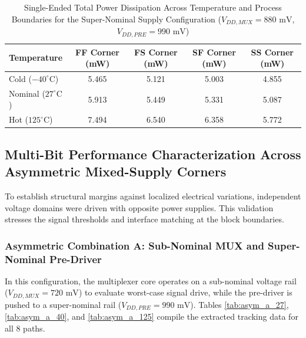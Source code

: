 \begin{table}[H]
    \centering
    \renewcommand{\arraystretch}{1.3}
    \setlength{\tabcolsep}{10pt}
    \small
    \begin{tabular}{|l|c|c|c|c|}
        \hline
        \textbf{Temperature} & \textbf{FF Corner (mW)} & \textbf{FS Corner (mW)} & \textbf{SF Corner (mW)} & \textbf{SS Corner (mW)} \\ \hline
        Cold ($-40^\circ\text{C}$) & 5.465 & 5.121 & 5.003 & 4.855 \\ \hline
        Nominal ($27^\circ\text{C}$) & 5.913 & 5.449 & 5.331 & 5.087 \\ \hline
        Hot ($125^\circ\text{C}$) & 7.494 & 6.540 & 6.358 & 5.772 \\ \hline
    \end{tabular}
    \vspace{2mm}
    \caption{Single-Ended Total Power Dissipation Across Temperature and Process Boundaries for the Super-Nominal Supply Configuration ($V_{DD,MUX} = 880\text{ mV}$, $V_{DD,PRE} = 990\text{ mV}$)}
    \label{tab:supernominal_power_summary}
\end{table}


\subsection{Multi-Bit Performance Characterization Across Asymmetric Mixed-Supply Corners}
\label{subsec:asymmetric_supply_multibit_corners}

To establish structural margins against localized electrical variations, independent voltage domains were driven with opposite power supplies. This validation stresses the signal thresholds and interface matching at the block boundaries.

\subsubsection*{Asymmetric Combination A: Sub-Nominal MUX and Super-Nominal Pre-Driver}

In this configuration, the multiplexer core operates on a sub-nominal voltage rail ($V_{DD,MUX} = 720\text{ mV}$) to evaluate worst-case signal drive, while the pre-driver is pushed to a super-nominal rail ($V_{DD,PRE} = 990\text{ mV}$). Tables \ref{tab:asym_a_27}, \ref{tab:asym_a_40}, and \ref{tab:asym_a_125} compile the extracted tracking data for all 8 paths.

